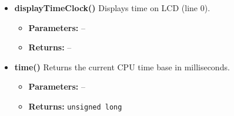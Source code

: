 \documentclass[a4paper,12pt]{article}
\begin{document}
\begin{itemize}
    \item \textbf{displayTimeClock()}  
    Displays time on LCD (line 0).  
    \begin{itemize}
        \item[] \textbf{Parameters:} --  
        \item[] \textbf{Returns:} --
    \end{itemize}

    \item \textbf{time()}  
    Returns the current CPU time base in milliseconds.  
    \begin{itemize}
        \item[] \textbf{Parameters:} --  
        \item[] \textbf{Returns:} \texttt{unsigned long}
    \end{itemize}
\end{itemize}
\end{document}
